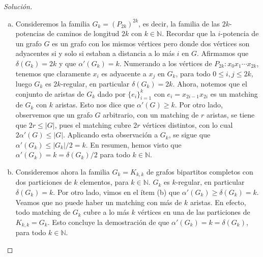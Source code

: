 \documentclass[12pt]{report}
\theoremstyle{plain}
\theoremstyle{definition}
\newenvironment{solution}{\begin{proof}[Solución]}{\end{proof}}
\newcommand{\naturals}{\mathbb{N}}
\newcommand{\abs}[1]{\left \vert #1 \right \vert}
\begin{document}
\begin{solution}
\begin{enumerate}[(a)]
\begin{enumerate}[(a)]
    \item Consideremos la familia $G_k = (P_{2k})^{2k}$, es decir, la familia de las $2k$-potencias de caminos de longitud $2k$ con $k \in \naturals$. Recordar que la $i$-potencia de un grafo $G$ es un grafo con los mismos vértices pero donde dos vértices son adyacentes si y solo si estaban a distancia a lo más $i$ en $G$. Afirmamos que $\delta (G_k) = 2k$ y que $\alpha ' (G_k) = k$. Numerando a los vértices de $P_{2k} : x_0 x_1 \cdots x_{2k}$, tenemos que claramente $x_i$ es adyacente a $x_j$ en $G_k$, para todo $0 \leq i, j \leq 2k$, luego $G_k$ es $2k$-regular, en particular $\delta (G_k) = 2k$. Ahora, notemos que el conjunto de aristas de $G_k$ dado por $\{ e_i\}_{i = 1}^k$ con $e_i = x_{2i-1}x_{2i}$ es un matching de $G_k$ con $k$ aristas. Esto nos dice que $\alpha ' (G) \geq k$. Por otro lado, observemos que un grafo $G$ arbitrario, con un matching de $r$ aristas, se tiene que $2 r \leq \abs G$, pues el matching cubre $2 r$ vértices distintos, con lo cual $2 \alpha ' (G) \leq \abs G$. Aplicando esta observación a $G_k$, se sigue que $\alpha ' (G_k) \leq \abs {G_k}/2 = k$. En resumen, hemos visto que $\alpha ' (G_k) = k = \delta (G_k)/2$ para todo $k \in \naturals$.
    \item Consideremos ahora la familia $G_k = K_{k,k}$ de grafos bipartitos completos con dos particiones de $k$ elementos, para $k \in \naturals$. $G_k$ es $k$-regular, en particular $\delta (G_k) = k$. Por otro lado, vimos en el ítem (b) que $\alpha ' (G_k) \geq \delta (G_k) = k$. Veamos que no puede haber un matching con más de $k$ aristas. En efecto, todo matching de $G_k$ cubre a lo más $k$ vértices en una de las particiones de $K_{k,k} = G_k$. Esto concluye la demostración de que $\alpha ' (G_k) = k = \delta (G_k)$, para todo $k \in \naturals$.
    \end{enumerate}
\end{enumerate}
\end{solution}
\end{document}
